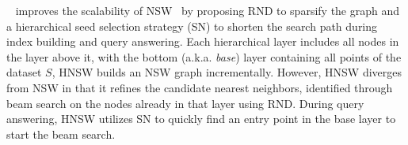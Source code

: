 ~\cite{hnsw} improves the scalability of NSW~\cite{nsw11,nsw14}  by proposing RND to sparsify the graph and a hierarchical seed selection strategy (SN) 
to shorten the search path during index building and query answering. Each hierarchical layer includes all nodes in the layer above it, with the bottom (a.k.a. {\it base}) layer containing all points of the dataset \( {S} \), 
HNSW builds an NSW graph incrementally. However, HNSW diverges from NSW in that it refines the candidate nearest neighbors, identified through beam search on the nodes already in that layer using RND. 
During query answering, HNSW utilizes SN to quickly find an entry point in the base layer to start the beam search.


